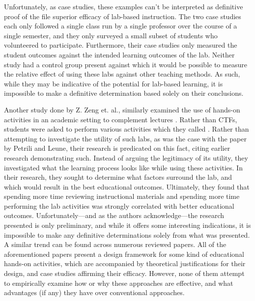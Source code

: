 \documentclass{article}
\begin{document}
    Unfortunately, as case studies, these examples can’t be interpreted as definitive proof of the file superior efficacy of lab-based instruction. 
    The two case studies each only followed a single class run by a single professor over the course of a single semester, and they only surveyed a small subset of students who volunteered to participate. Furthermore, their case studies only measured the student outcomes against the intended learning outcomes of the lab. Neither study had a control group present against which it would be possible to measure the relative effect of using these labs against other teaching methods. As such, while they may be indicative of the potential for lab-based learning, it is impossible to make a definitive determination based solely on their conclusions.

    Another study done by Z. Zeng et. al., similarly examined the use of hands-on activities in an academic setting to complement lectures \cite{Z-Zeng}. Rather than CTFs, students were asked to perform various activities which they called . Rather than attempting to investigate the utility of such labs, as was the case with the paper by Petrili and Leune, their research is predicated on this fact, citing earlier research demonstrating such. Instead of arguing the legitimacy of its utility, they investigated what the learning process looks like while using these activities. In their research, they sought to determine what factors surround the lab, and which would result in the best educational outcomes. Ultimately, they found that spending more time reviewing instructional materials and spending more time performing the lab activities was strongly correlated with better educational outcomes. Unfortunately---and as the authors acknowledge---the research presented is only preliminary, and while it offers some interesting indications, it is impossible to make any definitive determinations solely from what was presented. A similar trend can be found across numerous reviewed papers\cite{Y-Deng,W-Du,N-Eliot}. All of the aforementioned papers present a design framework for some kind of educational hands-on activities, which are accompanied by theoretical justifications for their design, and case studies affirming their efficacy. However, none of them attempt to empirically examine how or why these approaches are effective, and what advantages (if any) they have over conventional approaches. 
\end{document}
